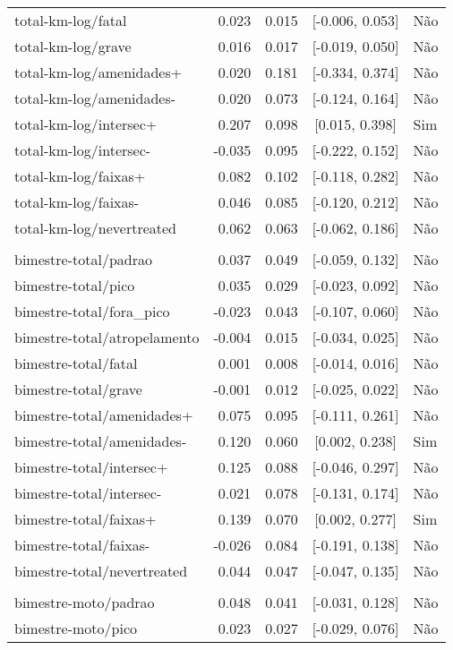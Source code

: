 \begin{longtable}{lrrcl}
total-km-log/fatal & 0.023 & 0.015 & {}[-0.006, 0.053] & Não\\
total-km-log/grave & 0.016 & 0.017 & {}[-0.019, 0.050] & Não\\
total-km-log/amenidades+ & 0.020 & 0.181 & {}[-0.334, 0.374] & Não\\
total-km-log/amenidades- & 0.020 & 0.073 & {}[-0.124, 0.164] & Não\\
total-km-log/intersec+ & 0.207 & 0.098 & {}[0.015, 0.398] & Sim\\
total-km-log/intersec- & -0.035 & 0.095 & {}[-0.222, 0.152] & Não\\
total-km-log/faixas+ & 0.082 & 0.102 & {}[-0.118, 0.282] & Não\\
total-km-log/faixas- & 0.046 & 0.085 & {}[-0.120, 0.212] & Não\\
total-km-log/nevertreated & 0.062 & 0.063 & {}[-0.062, 0.186] & Não\\
 &  &  &  & \\
bimestre-total/padrao & 0.037 & 0.049 & {}[-0.059, 0.132] & Não\\
bimestre-total/pico & 0.035 & 0.029 & {}[-0.023, 0.092] & Não\\
bimestre-total/fora\_pico & -0.023 & 0.043 & {}[-0.107, 0.060] & Não\\
bimestre-total/atropelamento & -0.004 & 0.015 & {}[-0.034, 0.025] & Não\\
bimestre-total/fatal & 0.001 & 0.008 & {}[-0.014, 0.016] & Não\\
bimestre-total/grave & -0.001 & 0.012 & {}[-0.025, 0.022] & Não\\
bimestre-total/amenidades+ & 0.075 & 0.095 & {}[-0.111, 0.261] & Não\\
bimestre-total/amenidades- & 0.120 & 0.060 & {}[0.002, 0.238] & Sim\\
bimestre-total/intersec+ & 0.125 & 0.088 & {}[-0.046, 0.297] & Não\\
bimestre-total/intersec- & 0.021 & 0.078 & {}[-0.131, 0.174] & Não\\
bimestre-total/faixas+ & 0.139 & 0.070 & {}[0.002, 0.277] & Sim\\
bimestre-total/faixas- & -0.026 & 0.084 & {}[-0.191, 0.138] & Não\\
bimestre-total/nevertreated & 0.044 & 0.047 & {}[-0.047, 0.135] & Não\\
 &  &  &  & \\
bimestre-moto/padrao & 0.048 & 0.041 & {}[-0.031, 0.128] & Não\\
bimestre-moto/pico & 0.023 & 0.027 & {}[-0.029, 0.076] & Não\\

\end{longtable}
